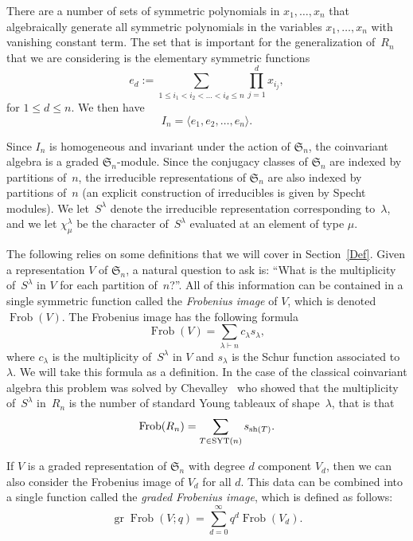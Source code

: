 \documentclass[10pt]{article}
\newcommand{\coloneqq}{:=}
\newcommand{\Frob}{\operatorname{Frob}}\newcommand{\gr}{\operatorname{gr}}
\begin{document}
There are a number of sets of symmetric polynomials in $x_1,\ldots, x_n$ that algebraically generate all symmetric polynomials 
in the variables $x_1,\ldots, x_n$ with vanishing constant term. The set that is important for the generalization of~$R_n$ 
that we are considering is the elementary symmetric functions 
\begin{equation}
e_d\coloneqq \sum_{1\leq i_1<i_2<\ldots< i_d\leq n} \prod_{j=1}^d x_{i_j},
\end{equation}
 for $1\leq d\leq n$. We then have
\begin{equation}
I_n=\langle e_1,e_2,\ldots, e_n\rangle.
\end{equation}

	Since $I_n$ is homogeneous and invariant under the action of $\mathfrak{S}_n$, the coinvariant algebra is a graded $
\mathfrak{S}_n$-module. Since the conjugacy classes of $\mathfrak{S}_n$ are indexed by partitions of~$n$, the 
irreducible representations of $\mathfrak{S}_n$ are also indexed by partitions of~$n$ (an explicit construction of 
irreducibles is given by Specht modules). We let~$S^\lambda$ denote the irreducible representation corresponding to~$
\lambda$, and we let $\chi^\lambda_\mu$ be the character of~$S^\lambda$ evaluated at an element of type $\mu$.

	The following relies on some definitions that we will cover in Section~\ref{Def}.
	Given a representation $V$ of $\mathfrak{S}_n$, a natural question to ask is: ``What is the multiplicity of~$S^\lambda$ in $
V$ for each partition of~$n$?''. All of this information can be contained in a single symmetric function called the \emph{Frobenius image} of $V$, which is denoted $\Frob (V)$. The Frobenius image has the following formula
\begin{equation}
	\Frob(V)=\sum_{\lambda\vdash n} c_\lambda s_\lambda,
\end{equation}
	where $c_\lambda$ is the multiplicity of~$S^\lambda$ in $V$ and $s_\lambda$ is the Schur function associated to~$\lambda$. 
	We will take this formula as a definition.
 In the case of the classical coinvariant algebra this problem was solved by Chevalley~\cite{C} who showed that the 
multiplicity of~$S^\lambda$ in~$R_n$ is the number of standard Young tableaux of shape~$\lambda$, that is that 
\begin{equation}
	\Frob (R_n)=\sum_{T\in \SYT(n)} s_{\sh(T)}.
\end{equation}

	If $V$ is a graded representation of $\mathfrak{S}_n$ with degree $d$ component $V_d$, then we can also consider the 
Frobenius image of $V_d$ for all $d$. This data can be combined into a single function called the \emph{graded Frobenius 
image}, which is defined as follows:
\begin{equation}
	\gr \Frob(V;q)=\sum_{d=0}^\infty q^d\Frob (V_d).
\end{equation}
\end{document}
